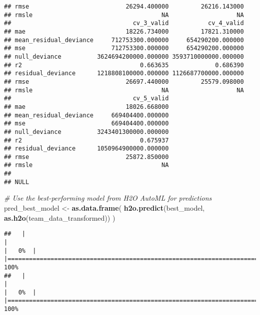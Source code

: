 \documentclass[
]{article}
\newenvironment{Shaded}{\begin{snugshade}}{\end{snugshade}}
\newcommand{\CommentTok}[1]{\textcolor[rgb]{0.56,0.35,0.01}{\textit{#1}}}
\newcommand{\FunctionTok}[1]{\textcolor[rgb]{0.13,0.29,0.53}{\textbf{#1}}}
\newcommand{\NormalTok}[1]{#1}
\newcommand{\OtherTok}[1]{\textcolor[rgb]{0.56,0.35,0.01}{#1}}
\begin{document}
\begin{verbatim}
## rmse                           26294.400000         26216.143000
## rmsle                                    NA                   NA
##                                  cv_3_valid           cv_4_valid
## mae                            18226.734000         17821.310000
## mean_residual_deviance     712753300.000000     654290200.000000
## mse                        712753300.000000     654290200.000000
## null_deviance          3624694200000.000000 3593710000000.000000
## r2                                 0.663635             0.686390
## residual_deviance      1218808100000.000000 1126687700000.000000
## rmse                           26697.440000         25579.098000
## rmsle                                    NA                   NA
##                                  cv_5_valid
## mae                            18026.668000
## mean_residual_deviance     669404400.000000
## mse                        669404400.000000
## null_deviance          3243401300000.000000
## r2                                 0.675937
## residual_deviance      1050964900000.000000
## rmse                           25872.850000
## rmsle                                    NA
## 
## NULL
\end{verbatim}

\begin{Shaded}
\begin{Highlighting}[]
\CommentTok{\# Use the best{-}performing model from H2O AutoML for predictions}
\NormalTok{pred\_best\_model }\OtherTok{\textless{}{-}} \FunctionTok{as.data.frame}\NormalTok{(}
  \FunctionTok{h2o.predict}\NormalTok{(best\_model, }\FunctionTok{as.h2o}\NormalTok{(team\_data\_transformed))}
\NormalTok{)}
\end{Highlighting}
\end{Shaded}

\begin{verbatim}
##   |                                                                              |                                                                      |   0%  |                                                                              |======================================================================| 100%
##   |                                                                              |                                                                      |   0%  |                                                                              |======================================================================| 100%
\end{verbatim}
\end{document}

